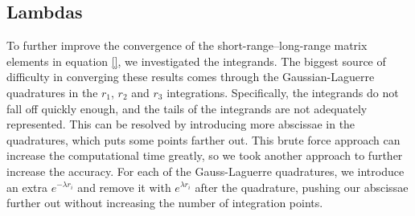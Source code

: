 \documentclass[preprint,showpacs,preprintnumbers,amsmath,amssymb]{revtex4}
\newcommand{\ee} {\,\text{e}}
\newcommand{\beq}{\begin{equation}}
\newcommand{\eeq}{\end{equation}}
\newcommand{\todoi}{\todo[inline]}
\begin{document}
\subsection{Lambdas}
\label{sec:Lambdas}
To further improve the convergence of the short-range--long-range matrix elements in equation \ref{}, we investigated the integrands. The biggest source of difficulty in converging these results comes through the Gaussian-Laguerre quadratures in the $r_1$, $r_2$ and $r_3$ integrations. Specifically, the integrands do not fall off quickly enough, and the tails of the integrands are not adequately represented. This can be resolved by introducing more abscissae in the quadratures, which puts some points farther out. This brute force approach can increase the computational time greatly, so we took another approach to further increase the accuracy. For each of the Gauss-Laguerre quadratures, we introduce an extra $e^{-\lambda r_i}$ and remove it with $e^{\lambda r_i}$ after the quadrature, pushing our abscissae further out without increasing the number of integration points.

%
%
\end{document}

